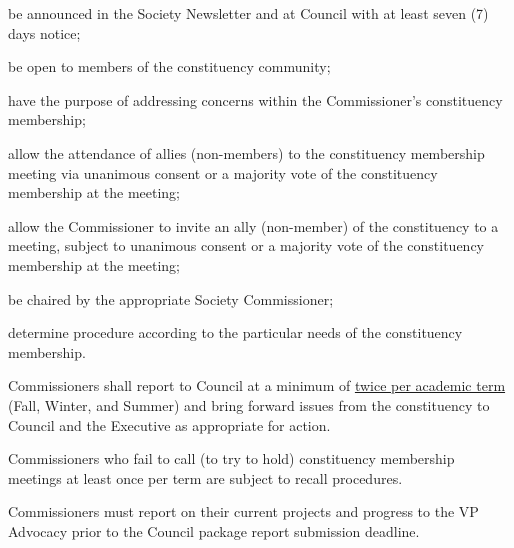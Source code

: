 \begin{longenum}[ label*=\thesubsection.\arabic*., align=left]
\begin{longenum}[ label*=\arabic*., align=left]
\item be announced in the Society Newsletter and at Council with at least seven (7) days notice;
\item be open to members of the constituency community;
\item have the purpose of addressing concerns within the Commissioner's constituency membership;
\item allow the attendance of allies (non-members) to the constituency membership meeting via unanimous consent or a majority vote of the constituency membership at the meeting;
\item allow the Commissioner to invite an ally (non-member) of the constituency to a meeting, subject to unanimous consent or a majority vote of the constituency membership at the meeting;
\item be chaired by the appropriate Society Commissioner;
\item determine procedure according to the particular needs of the constituency membership.
\end{longenum}
\item Commissioners shall report to Council at a minimum of \underline{twice per academic term} (Fall, Winter, and Summer) and bring forward issues from the constituency to Council and the Executive as appropriate for action.
\item Commissioners who fail to call (to try to hold) constituency membership meetings at least once per term are subject to recall procedures.
\item Commissioners must report on their current projects and progress to the VP Advocacy prior to the Council package report submission deadline.
\end{longenum}


